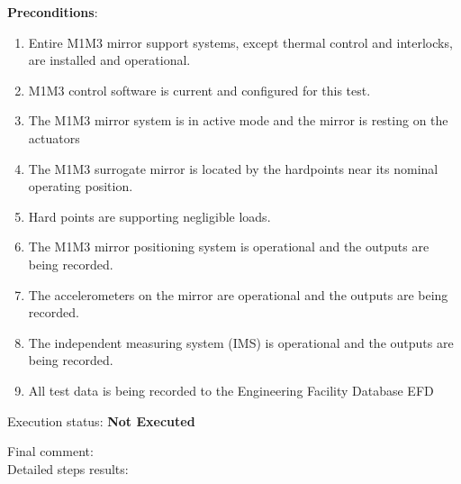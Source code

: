 \documentclass[SE,lsstdraft,STR,toc]{lsstdoc}
\providecommand{\tightlist}{
  \setlength{\itemsep}{0pt}\setlength{\parskip}{0pt}}
\begin{document}
\textbf{ Preconditions}:\\
\begin{enumerate}
\tightlist
\item
  Entire M1M3 mirror support systems, except thermal control and
  interlocks, are installed and operational.
\item
  M1M3 control software is current and configured for this test.
\item
  The M1M3 mirror system is in active mode and the mirror is resting on
  the actuators
\item
  The M1M3 surrogate mirror is located by the hardpoints near its
  nominal operating position.
\item
  Hard points are supporting negligible loads.
\item
  The M1M3 mirror positioning system is operational and the outputs are
  being recorded.
\item
  The accelerometers on the mirror are operational and the outputs are
  being recorded.
\item
  The independent measuring system (IMS) is operational and the outputs
  are being recorded.
\item
  All test data is being recorded to the Engineering Facility Database
  EFD
\end{enumerate}

Execution status: {\bf Not Executed }

Final comment:\\


Detailed steps results:
\end{document}

